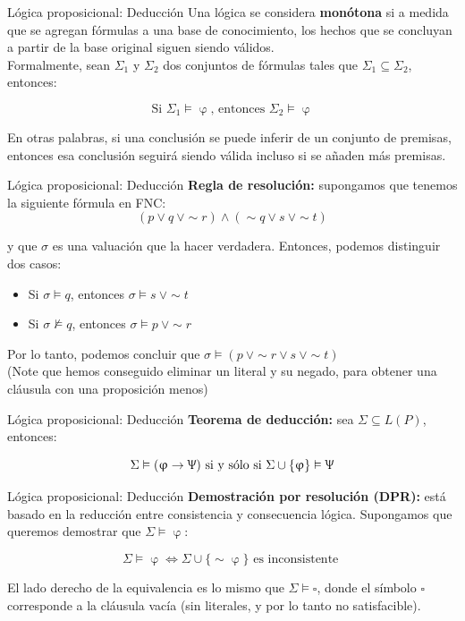 \documentclass{beamer}
\begin{document}
\begin{frame}{Lógica proposicional: Deducción}
  Una lógica se considera \textbf{monótona} si a medida que se agregan fórmulas
  a una base de conocimiento, los hechos que se concluyan a partir de la base
  original siguen siendo válidos.\\

  Formalmente, sean $\Sigma_{1}$ y $\Sigma_{2}$ dos conjuntos de fórmulas tales que $\Sigma_{1} \subseteq \Sigma_{2}$, entonces:

  $$\text{Si } \Sigma_{1} \vDash \upvarphi \text{, entonces } \Sigma_{2} \vDash \upvarphi$$

  En otras palabras, si una conclusión se puede inferir de un conjunto de
  premisas, entonces esa conclusión seguirá siendo válida incluso si se añaden
  más premisas.
\end{frame}


\begin{frame}{Lógica proposicional: Deducción}
  \textbf{Regla de resolución:} supongamos que tenemos la siguiente fórmula en
  FNC:
  $$(p \vee q\ \vee \sim r) \land (\sim q \vee s\ \vee \sim t)$$

  y que $\sigma$ es una valuación que la hacer verdadera. Entonces, podemos distinguir dos casos:

  \begin{itemize}
    \item Si $\sigma \vDash q$, entonces $\sigma \vDash s\ \vee \sim t$
    \item Si $\sigma \nvDash q$, entonces $\sigma \vDash p\ \vee \sim r$
  \end{itemize}

  Por lo tanto, podemos concluir que
  $\sigma \vDash (p\ \vee \sim r \vee s\ \vee \sim t)$\\

  (Note que hemos conseguido eliminar un literal y su negado, para obtener una
  cláusula con una proposición menos)
\end{frame}


\begin{frame}{Lógica proposicional: Deducción}
  \textbf{Teorema de deducción:} sea $\Sigma \subseteq L(P)$, entonces:

  $$\Sigma \vDash (\upvarphi \rightarrow \Uppsi) \text{ si y sólo si } \Sigma \cup \{\upvarphi\} \vDash \Uppsi$$
\end{frame}


\begin{frame}{Lógica proposicional: Deducción}
  \textbf{Demostración por resolución (DPR):} está basado en la reducción entre
  consistencia y consecuencia lógica. Supongamos que queremos demostrar que
  $\Sigma \vDash \upvarphi$:

  $$\Sigma \vDash \upvarphi \Leftrightarrow \Sigma \cup \{\sim \upvarphi\} \text{ es inconsistente }$$

  El lado derecho de la equivalencia es lo mismo que $\Sigma \vDash \square$,
  donde el símbolo $\square$ corresponde a la cláusula vacía (sin literales, y
  por lo tanto no satisfacible).
\end{frame}
\end{document}
